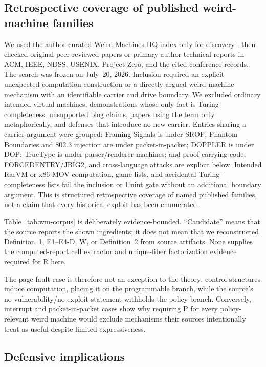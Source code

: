 \documentclass[conference]{IEEEtran}
\begin{document}
\subsection{Retrospective coverage of published weird-machine families}

We used the author-curated Weird Machines HQ index only for discovery \cite{ref54}, then checked original peer-reviewed papers or primary author technical reports in ACM, IEEE, NDSS, USENIX, Project Zero, and the cited conference records. The search was frozen on July~20, 2026. Inclusion required an explicit unexpected-computation construction or a directly argued weird-machine mechanism with an identifiable carrier and drive boundary. We excluded ordinary intended virtual machines, demonstrations whose only fact is Turing completeness, unsupported blog claims, papers using the term only metaphorically, and defenses that introduce no new carrier. Entries sharing a carrier argument were grouped: Framing Signals is under SROP; Phantom Boundaries and 802.3 injection are under packet-in-packet; DOPPLER is under DOP; TrueType is under parser/renderer machines; and proof-carrying code, FORCEDENTRY/JBIG2, and cross-language attacks are explicit below. Intended RarVM or x86-MOV computation, game lists, and accidental-Turing-completeness lists fail the inclusion or Unint gate without an additional boundary argument. This is structured retrospective coverage of named published families, not a claim that every historical exploit has been enumerated.

Table~\ref{tab:wm-corpus} is deliberately evidence-bounded. ``Candidate'' means that the source reports the shown ingredients; it does not mean that we reconstructed Definition~1, E1--E4-D, W, or Definition~2 from source artifacts. None supplies the computed-report cell extractor and unique-fiber factorization evidence required for R here.

The page-fault case is therefore not an exception to the theory: control structures induce computation, placing it on the programmable branch, while the source's no-vulnerability/no-exploit statement withholds the policy branch. Conversely, interrupt and packet-in-packet cases show why requiring P for every policy-relevant weird machine would exclude mechanisms their sources intentionally treat as useful despite limited expressiveness.

\subsection{Defensive implications}
\end{document}
